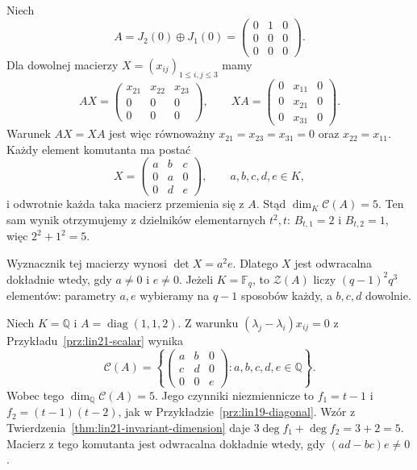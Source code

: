 \begin{przyklad}
\label{prz:lin21-nilpotent}
Niech
\[
 A=J_2(0)\oplus J_1(0)
 =\begin{pmatrix}0&1&0\\0&0&0\\0&0&0\end{pmatrix}.
\]
Dla dowolnej macierzy
\(X=(x_{ij})_{1\le i,j\le3}\)
mamy
\[
 AX=\begin{pmatrix}
 x_{21}&x_{22}&x_{23}\\0&0&0\\0&0&0
 \end{pmatrix},
 \qquad
 XA=\begin{pmatrix}
 0&x_{11}&0\\0&x_{21}&0\\0&x_{31}&0
 \end{pmatrix}.
\]
Warunek \(AX=XA\) jest więc
równoważny
\(x_{21}=x_{23}=x_{31}=0\)
oraz \(x_{22}=x_{11}\).
Każdy element komutanta ma postać
\[
 X=\begin{pmatrix}
 a&b&c\\0&a&0\\0&d&e
 \end{pmatrix},
 \qquad a,b,c,d,e\in K,
\]
i odwrotnie każda taka macierz
przemienia się z \(A\).
Stąd \(\dim_K\mathcal C(A)=5\).
Ten sam wynik otrzymujemy
z dzielników elementarnych \(t^2,t\):
\(B_{t,1}=2\) i \(B_{t,2}=1\),
więc \(2^2+1^2=5\).

Wyznacznik tej macierzy wynosi
\(\det X=a^2e\).
Dlatego \(X\) jest odwracalna
dokładnie wtedy, gdy \(a\ne0\)
i \(e\ne0\).
Jeżeli \(K=\mathbb F_q\),
to \(\mathcal Z(A)\) liczy
\((q-1)^2q^3\) elementów:
parametry \(a,e\) wybieramy
na \(q-1\) sposobów każdy,
a \(b,c,d\) dowolnie.
\end{przyklad}

\begin{przyklad}
\label{prz:lin21-diagonal}
Niech \(K=\mathbb Q\)
i \(A=\operatorname{diag}(1,1,2)\).
Z warunku \((\lambda_j-\lambda_i)x_{ij}=0\)
z Przykładu~\ref{prz:lin21-scalar}
wynika
\[
 \mathcal C(A)=
 \left\{\begin{pmatrix}
 a&b&0\\c&d&0\\0&0&e
 \end{pmatrix}:a,b,c,d,e\in\mathbb Q\right\}.
\]
Wobec tego
\(\dim_{\mathbb Q}\mathcal C(A)=5\).
Jego czynniki niezmiennicze to
\(f_1=t-1\) i
\(f_2=(t-1)(t-2)\), jak w
Przykładzie~\ref{prz:lin19-diagonal}.
Wzór z
Twierdzenia~\ref{thm:lin21-invariant-dimension}
daje
\(3\deg f_1+\deg f_2=3+2=5\).
Macierz z tego komutanta
jest odwracalna dokładnie wtedy,
gdy \((ad-bc)e\ne0\).
\end{przyklad}

